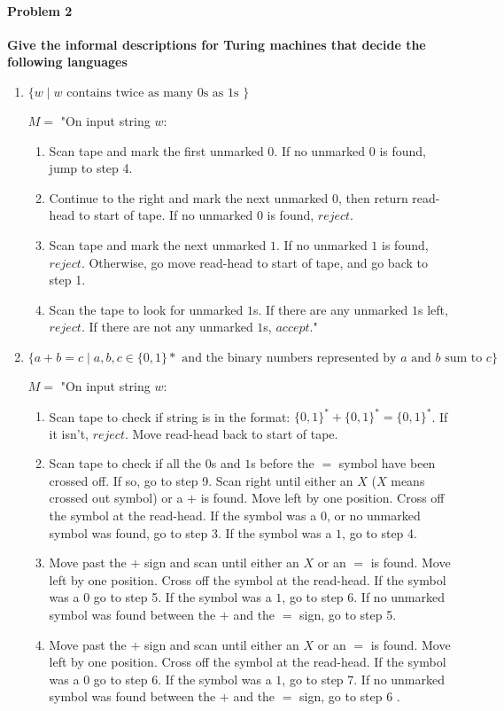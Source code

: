 \documentclass{article}
\begin{document}
\paragraph{Problem 2}
\textbf{Give the informal descriptions for Turing machines that decide the following languages}
\begin{enumerate}[\indent a)]
    \item $\{w \;|\; w \text{ contains twice as many 0s as 1s }\}$
    
	$M = $ "On input string $w$:
	\begin{enumerate}[\indent 1.]
		\item Scan tape and mark the first unmarked $0$. If no unmarked $0$ is found, jump to step 4.
		\item Continue to the right and mark the next unmarked $0$, then return read-head to start of tape. If no unmarked $0$ is found, $reject$.
		\item Scan tape and mark the next unmarked $1$. If no unmarked $1$ is found, $reject$. Otherwise, go move read-head to start of tape, and go back to step 1.
		\item Scan the tape to look for unmarked $1$s. If there are any unmarked $1$s left, $reject$. If there are not any unmarked $1$s, $accept$."	
    \end{enumerate}


    \item $\{a+b=c \;|\; a,b,c \in \{0,1\}* \text{ and the binary numbers represented by $a$ 
    and $b$ sum to $c$} \}$
    
    $M = $ "On input string $w$:
    \begin{enumerate}[\indent 1.]
		\item Scan tape to check if string is in the format: $\{0,1\}^* + \{0,1\}^* = \{0,1\}^* $. If it isn't, $reject$. Move read-head back to start of tape.
		\item Scan tape to check if all the $0$s and $1$s  before the $=$ symbol have been crossed off. If so, go to step 9. Scan right until either an $X$ ($X$ means crossed out symbol) or a $+$ is found. Move left by one position. Cross off the symbol at the read-head. If the symbol was a $0$, or no unmarked symbol was found, go to step 3. If the symbol was a $1$, go to step 4.
		
		
		\item Move past the $+$ sign and scan until either an $X$ or an $=$ is found. Move left by one position. Cross off the symbol at the read-head. If the symbol was a $0$ go to step 5. If the symbol was a $1$, go to step 6. If no unmarked symbol was found between the $+$ and the $=$ sign, go to step 5.
		\item Move past the $+$ sign and scan until either an $X$ or an $=$ is found. Move left by one position. Cross off the symbol at the read-head. If the symbol was a $0$ go to step 6. If the symbol was a $1$, go to step 7. If no unmarked symbol was found between the $+$ and the $=$ sign, go to step 6 .
		

\end{enumerate}
\end{enumerate}
\end{document}
